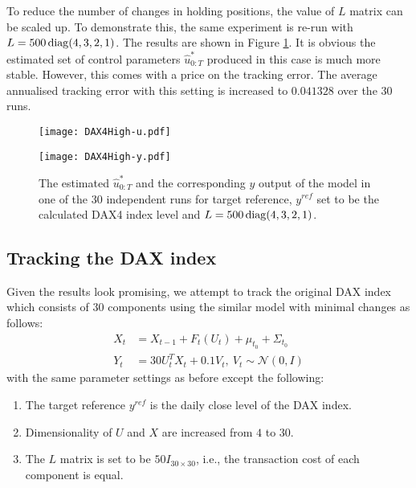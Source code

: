 To reduce the number of changes in holding positions, the value of $L$ matrix can be scaled up. To demonstrate this, the same experiment is re-run with $L = 500\operatorname{diag}(4,3,2,1)$. The results are shown in Figure \ref{fig:dax42}. It is obvious the estimated set of control parameters $\hat{u}^*_{0:T}$ produced in this case is much more stable. However, this comes with a price on the tracking error. The average annualised tracking error with this setting is increased to $0.041328$ over the $30$ runs. 

\begin{figure}[htbp]
\centering
    \begin{minipage}{0.5\textwidth}
        \centering
        \texttt{[image: DAX4High-u.pdf]}
    \end{minipage}%
    \begin{minipage}{0.5\textwidth}
        \centering
        \texttt{[image: DAX4High-y.pdf]}
    \end{minipage}
\caption{The estimated $\hat{u}^*_{0:T}$ and the corresponding $y$ output of the model in one of the 30 independent runs for target reference, $y^{ref}$ set to be the calculated DAX4 index level and $L = 500\operatorname{diag}(4,3,2,1)$.}
\label{fig:dax42}
\end{figure}

\subsection{Tracking the DAX index}
Given the results look promising, we attempt to track the original DAX index which consists of $30$ components using the similar model with minimal changes as follows:
\begin{align}
  X_t &= X_{t-1} + F_t(U_t) + \mu_{t_0} + \Sigma_{t_0} \\
  Y_t &= 30U^T_tX_t + 0.1V_t,~V_t \sim \mathcal{N}(0, I)
\end{align}
with the same parameter settings as before except the following:
\begin{enumerate}
\item The target reference $y^{ref}$ is the daily close level of the DAX index.
\item Dimensionality of $U$ and $X$ are increased from $4$ to $30$.
\item The $L$ matrix is set to be $50I_{30 \times 30}$, i.e., the transaction cost of each component is equal.
\end{enumerate}

